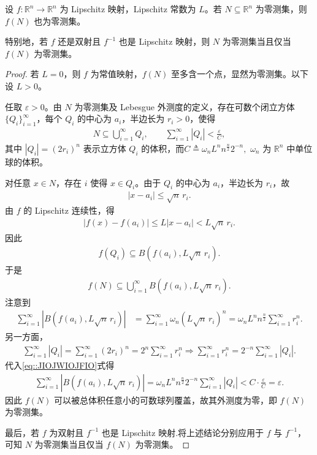 \documentclass[../../main.tex]{subfiles}%
\begin{document}
\begin{lemma}[Lipschitz映射保持零测集]\label{lemma:Lipschitz映射保持零测集}
设 $f:\mathbb{R}^n\to\mathbb{R}^n$ 为 Lipschitz 映射，Lipschitz 常数为 $L$。若 $N\subseteq\mathbb{R}^n$ 为零测集，则 $f(N)$ 也为零测集。

特别地，若 $f$ 还是双射且 $f^{-1}$ 也是 Lipschitz 映射，则 $N$ 为零测集当且仅当 $f(N)$ 为零测集。
\end{lemma}
\begin{proof}

若 $L=0$，则 $f$ 为常值映射，$f(N)$ 至多含一个点，显然为零测集。以下设 $L>0$。

任取 $\varepsilon>0$。由 $N$ 为零测集及 Lebesgue 外测度的定义，存在可数个闭立方体 $\{Q_i\}_{i=1}^{\infty}$，每个 $Q_i$ 的中心为 $a_i$，半边长为 $r_i>0$，使得
\begin{align*}
N\subseteq\bigcup\limits_{i=1}^{\infty}Q_i,\qquad
\sum\limits_{i=1}^{\infty}|Q_i|<\frac{\varepsilon}{C},
\end{align*}
其中 $|Q_i|=(2r_i)^n$ 表示立方体 $Q_i$ 的体积，而$C\triangleq \omega_n L^n n^{\frac n2}2^{-n},$
$\omega_n$ 为 $\mathbb{R}^n$ 中单位球的体积。

对任意 $x\in N$，存在 $i$ 使得 $x\in Q_i$。由于 $Q_i$ 的中心为 $a_i$，半边长为 $r_i$，故
\begin{align*}
|x-a_i|\leqslant\sqrt{n}\,r_i.
\end{align*}
由 $f$ 的 Lipschitz 连续性，得
\begin{align*}
|f(x)-f(a_i)|\leqslant L|x-a_i|<L\sqrt{n}\,r_i.
\end{align*}
因此
\begin{align*}
f(Q_i)\subseteq B(f(a_i),L\sqrt{n}\,r_i).
\end{align*}
于是
\begin{align*}
f(N)\subseteq\bigcup\limits_{i=1}^{\infty}B(f(a_i),L\sqrt{n}\,r_i).
\end{align*}
注意到
\begin{align}\label{eq::JIOJWIOJFIO}
\sum\limits_{i=1}^{\infty}|B(f(a_i),L\sqrt{n}\,r_i)|
&=\sum\limits_{i=1}^{\infty}\omega_n (L\sqrt{n}\,r_i)^n
=\omega_n L^n n^{\frac n2}\sum\limits_{i=1}^{\infty}r_i^n.
\end{align}
另一方面，
\begin{align*}
\sum\limits_{i=1}^{\infty}|Q_i|
=\sum\limits_{i=1}^{\infty}(2r_i)^n
=2^n\sum\limits_{i=1}^{\infty}r_i^n\Longrightarrow \sum\limits_{i=1}^{\infty}r_i^n
=2^{-n}\sum\limits_{i=1}^{\infty}|Q_i|.
\end{align*}
代入\eqref{eq::JIOJWIOJFIO}式得
\begin{align*}
\sum\limits_{i=1}^{\infty}|B(f(a_i),L\sqrt{n}\,r_i)|
=\omega_n L^n n^{\frac n2}2^{-n}\sum\limits_{i=1}^{\infty}|Q_i|
<C\cdot\frac{\varepsilon}{C}
=\varepsilon.
\end{align*}
因此 $f(N)$ 可以被总体积任意小的可数球列覆盖，故其外测度为零，即 $f(N)$ 为零测集。

最后，若 $f$ 为双射且 $f^{-1}$ 也是 Lipschitz 映射.将上述结论分别应用于 $f$ 与 $f^{-1}$，可知 $N$ 为零测集当且仅当 $f(N)$ 为零测集。
\end{proof}
\end{document}
